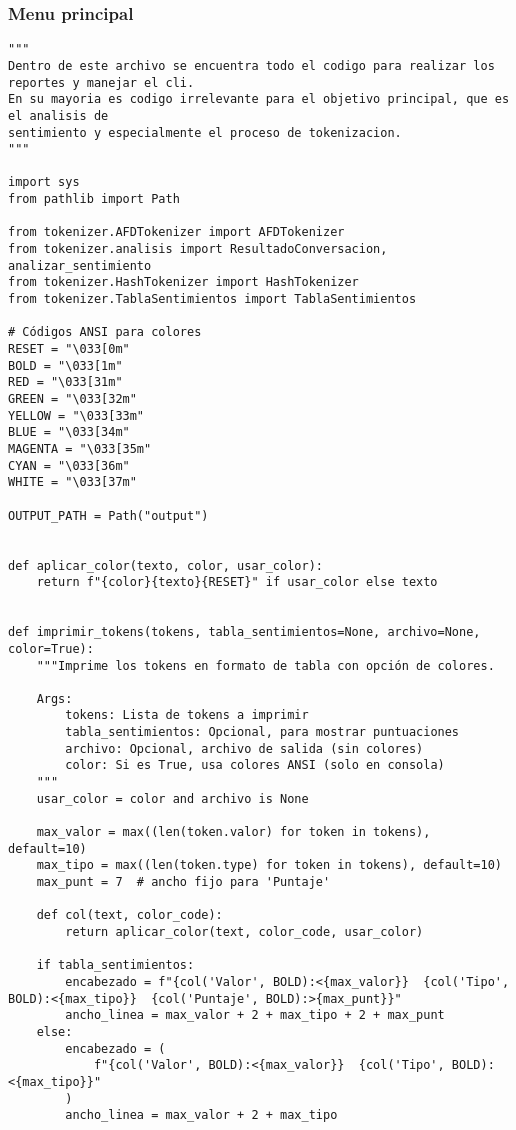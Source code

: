 \subsubsection{Menu principal}
\begin{lstlisting}
"""
Dentro de este archivo se encuentra todo el codigo para realizar los reportes y manejar el cli.
En su mayoria es codigo irrelevante para el objetivo principal, que es el analisis de
sentimiento y especialmente el proceso de tokenizacion.
"""

import sys
from pathlib import Path

from tokenizer.AFDTokenizer import AFDTokenizer
from tokenizer.analisis import ResultadoConversacion, analizar_sentimiento
from tokenizer.HashTokenizer import HashTokenizer
from tokenizer.TablaSentimientos import TablaSentimientos

# Códigos ANSI para colores
RESET = "\033[0m"
BOLD = "\033[1m"
RED = "\033[31m"
GREEN = "\033[32m"
YELLOW = "\033[33m"
BLUE = "\033[34m"
MAGENTA = "\033[35m"
CYAN = "\033[36m"
WHITE = "\033[37m"

OUTPUT_PATH = Path("output")


def aplicar_color(texto, color, usar_color):
    return f"{color}{texto}{RESET}" if usar_color else texto


def imprimir_tokens(tokens, tabla_sentimientos=None, archivo=None, color=True):
    """Imprime los tokens en formato de tabla con opción de colores.

    Args:
        tokens: Lista de tokens a imprimir
        tabla_sentimientos: Opcional, para mostrar puntuaciones
        archivo: Opcional, archivo de salida (sin colores)
        color: Si es True, usa colores ANSI (solo en consola)
    """
    usar_color = color and archivo is None

    max_valor = max((len(token.valor) for token in tokens), default=10)
    max_tipo = max((len(token.type) for token in tokens), default=10)
    max_punt = 7  # ancho fijo para 'Puntaje'

    def col(text, color_code):
        return aplicar_color(text, color_code, usar_color)

    if tabla_sentimientos:
        encabezado = f"{col('Valor', BOLD):<{max_valor}}  {col('Tipo', BOLD):<{max_tipo}}  {col('Puntaje', BOLD):>{max_punt}}"
        ancho_linea = max_valor + 2 + max_tipo + 2 + max_punt
    else:
        encabezado = (
            f"{col('Valor', BOLD):<{max_valor}}  {col('Tipo', BOLD):<{max_tipo}}"
        )
        ancho_linea = max_valor + 2 + max_tipo


\end{lstlisting}
